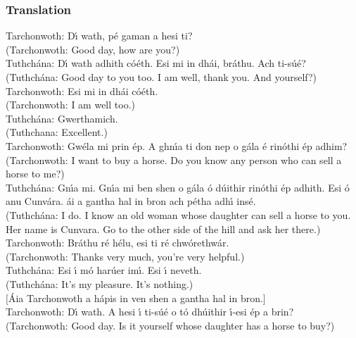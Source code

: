 \newpage
\subsubsection{Translation}

Tarchonwoth: D\'{\i} wath, p\'{e} gaman a hesi ti?\\
(Tarchonwoth: Good day, how are you?)\\

Tuthch\'{a}na: D\'{\i} wath adhith c\'{o}\'{e}th. Esi mi in dh\'{a}i, br\'{a}thu. Ach ti-s\'{u}\'{e}?\\
(Tuthch\'{a}na: Good day to you too. I am well, thank you. And yourself?)\\

Tarchonwoth: Esi mi in dh\'{a}i c\'{o}\'{e}th.\\
(Tarchonwoth: I am well too.)\\

Tuthch\'{a}na: Gwerthamich.\\
(Tuthchana: Excellent.)\\

Tarchonwoth: Gw\'{e}la mi prin \'{e}p. A ghn\'{\i}a ti don nep o g\'{a}la \'{e} rin\'{o}thi \'{e}p adhim?\\
(Tarchonwoth: I want to buy a horse. Do you know any person who can sell a horse to me?)\\

Tuthch\'{a}na: Gn\'{\i}a mi. Gn\'{\i}a mi ben shen o g\'{a}la \'{o} d\'{u}ithir rin\'{o}thi \'{e}p adhith. Esi \'{o} anu Cunv\'{a}ra. \'{a}i a gantha hal in bron ach p\'{e}tha adh\'{\i} ins\'{e}.\\
(Tuthch\'{a}na: I do. I know an old woman whose daughter can sell a horse to you. Her name is Cunvara. Go to the other side of the hill and ask her there.)\\

Tarchonwoth: Br\'{a}thu r\'{e} h\'{e}lu, esi ti r\'{e} chw\'{o}rethw\'{a}r.\\
(Tarchonwoth: Thanks very much, you're very helpful.)\\

Tuthch\'{a}na: Esi \'{\i} m\'{o} har\'{u}er im\'{\i}. Esi \'{\i} neveth.\\
(Tuthch\'{a}na: It's my pleasure. It's nothing.)\\

$[$\'{A}ia Tarchonwoth a h\'{a}pis in ven shen a gantha hal in bron.$]$\\

Tarchonwoth: D\'{\i} wath. A hesi \'{\i} ti-s\'{u}\'{e} o t\'{o} dh\'{u}ithir \'{\i}-esi \'{e}p a brin?\\
(Tarchonwoth: Good day. Is it yourself whose daughter has a horse to buy?)\\

